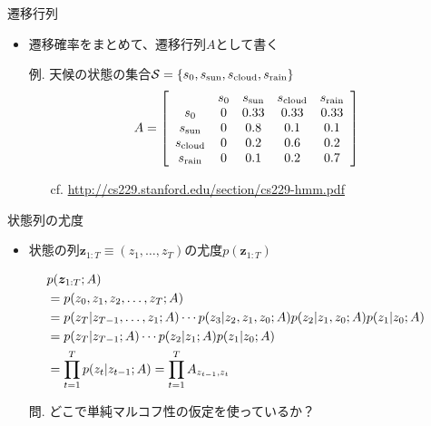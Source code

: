 \documentclass[aspectratio=169,unicode,dvipdfmx,14pt]{beamer}
\begin{document}
\begin{frame}{遷移行列}
\begin{itemize}
\item 遷移確率をまとめて、遷移行列$A$として書く
\item[例.] 天候の状態の集合$\mathcal{S} = \{ s_0, s_{\mbox{\scriptsize sun}},
s_{\mbox{\scriptsize cloud}}, s_{\mbox{\scriptsize rain}} \}$
\begin{align}
A = \left[
    \begin{array}{ccccc}
 & s_0 & s_{\mbox{\scriptsize sun}} & s_{\mbox{\scriptsize cloud}} & s_{\mbox{\scriptsize rain}} \\
s_0 & 0 & 0.33 & 0.33 & 0.33 \\
s_{\mbox{\scriptsize sun}} & 0 & 0.8 & 0.1 & 0.1 \\
s_{\mbox{\scriptsize cloud}} & 0 & 0.2 & 0.6 & 0.2 \\
s_{\mbox{\scriptsize rain}} & 0 & 0.1 & 0.2 & 0.7
    \end{array}
  \right]
\end{align}
\vspace{-.1in}
\begin{itemize}
\item[cf.] \href{http://cs229.stanford.edu/section/cs229-hmm.pdf}{http://cs229.stanford.edu/section/cs229-hmm.pdf}
\end{itemize}
\end{itemize}
\end{frame}

\begin{frame}{状態列の尤度}
\begin{itemize}
\item 状態の列$\bm{z}_{1:T}\equiv(z_1,\ldots,z_T)$の尤度$p(\bm{z}_{1:T})$
\end{itemize}
\begin{align}
& p(\bm{z}_{1:T};A) 
\notag \\ & = p(z_0,z_1,z_2,\ldots,z_T;A)
\notag \\ 
& = p(z_T | z_{T-1},\ldots,z_1;A) \cdots 
p(z_3|z_2,z_1,z_0;A)p(z_2|z_1,z_0;A) p(z_1|z_0;A) \notag \\
& = p(z_T | z_{T-1};A) \cdots p(z_2|z_1;A) p(z_1|z_0;A) \notag \\
& = \prod_{t=1}^T p(z_t | z_{t-1};A) = \prod_{t=1}^T A_{z_{t-1}, z_t}
\label{eq:seq_LH}
\end{align}
\vspace{-.1in}
\begin{itemize}
\item[問.] どこで単純マルコフ性の仮定を使っているか？
\end{itemize}
\end{frame}
\end{document}
